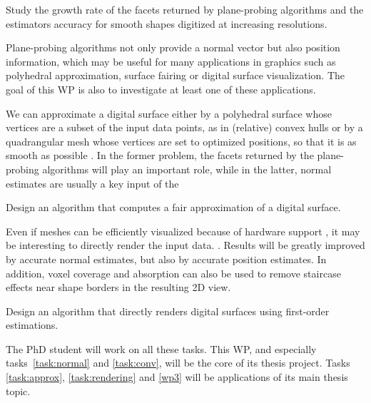 \begin{Task}
  \label{task:conv}
  Study the growth rate of the facets returned by plane-probing algorithms
  and the estimators accuracy for smooth shapes digitized at increasing resolutions. 
\end{Task}

Plane-probing algorithms not only provide a normal vector but also position information,
which may be useful for many applications in graphics such as polyhedral approximation,
surface fairing or digital surface visualization. The goal of this WP is also to investigate
at least one of these applications.   

We can approximate a digital surface either by a polyhedral surface whose vertices 
are a subset of the input data points, as in (relative) convex hulls 
\cite{Klette2001,Schultz2009} 
or by a quadrangular mesh whose vertices are set to optimized positions, so that it is
as smooth as possible \cite{Coeurjolly2017}. In the former problem, the facets returned by the
plane-probing algorithms will play an important role, while in the latter,
normal estimates are usually a key input of the   

\begin{Task}
  \label{task:approx}
  Design an algorithm that computes a fair approximation of a digital surface. 
\end{Task}

Even if meshes can be efficiently visualized because of hardware
support ,
it may be interesting to directly render the input data. . Results will be greatly improved by accurate normal estimates,
but also by accurate position estimates. In addition, voxel coverage and absorption can
also be used to remove staircase effects near shape borders in the resulting 2D view.

\begin{Task}
  \label{task:rendering}
  Design an algorithm that directly renders digital surfaces using first-order estimations.  
\end{Task}

The PhD student will work on all these tasks. This WP, and especially tasks~\ref{task:normal}
and \ref{task:conv}, will be the core of its thesis project. Tasks \ref{task:approx},
\ref{task:rendering} and \ref{wp3} will be applications of its main thesis topic.  

